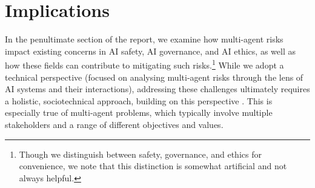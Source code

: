\documentclass[a4paper]{article}
\begin{document}








\section{Implications}
\label{sec:implications}

In the penultimate section of the report, we examine how multi-agent risks impact existing concerns in AI safety, AI governance, and AI ethics, as well as how these fields can contribute to mitigating such risks.\footnote{Though we distinguish between safety, governance, and ethics for convenience, we note that this distinction is somewhat artificial and not always helpful.}
While we adopt a technical perspective (focused on analysing multi-agent risks through the lens of AI systems and their interactions), addressing these challenges ultimately requires a holistic, sociotechnical approach, building on this perspective \citep{Lazar2023,Curtis2024,Weidinger2023a}.
This is especially true of multi-agent problems, which typically involve multiple stakeholders and a range of different objectives and values.







\appendix




\printbibliography[heading=bibintoc]


\end{document}
